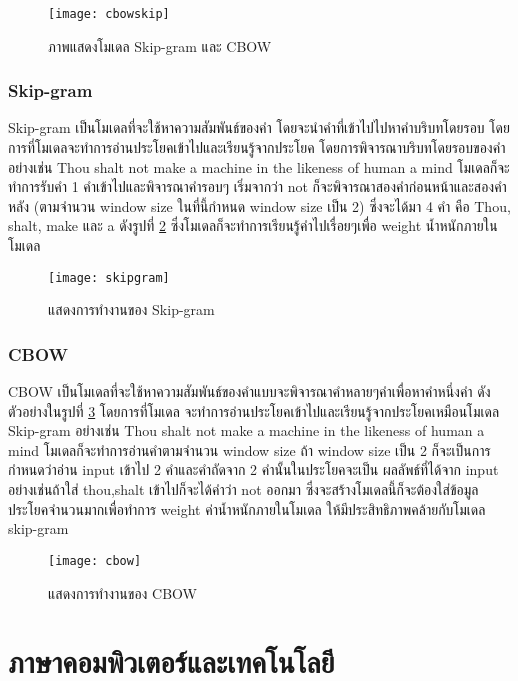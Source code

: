 \begin{figure}[H]
    \centering
    \texttt{[image: cbowskip]}
    \caption{ภาพแสดงโมเดล Skip-gram และ CBOW \cite{ichi}}\label{fig:cbowskip}
\end{figure}

\subsubsection{Skip-gram}

Skip-gram\cite{ichi} เป็นโมเดลที่จะใช้หาความสัมพันธ์ของคำ โดยจะนำคำที่เข้าไปไปหาคำบริบทโดยรอบ โดยการที่โมเดลจะทำการอ่านประโยคเข้าไปและเรียนรู้จากประโยค 
โดยการพิจารณาบริบทโดยรอบของคำ อย่างเช่น Thou shalt not make a machine in the likeness of human a mind โมเดลก็จะทำการรับคำ 
1 คำเข้าไปและพิจารณาคำรอบๆ เริ่มจากว่า not ก็จะพิจารณาสองคำก่อนหน้าและสองคำหลัง (ตามจำนวน window size ในที่นี้กำหนด window size เป็น 2) 
ซึ่งจะได้มา 4 คำ คือ Thou, shalt, make และ a ดังรูปที่ \ref{fig:skipgram} ซึ่งโมเดลก็จะทำการเรียนรู้คำไปเรื่อยๆเพื่อ weight น้ำหนักภายในโมเดล
\begin{figure}[H]
    \centering
    \texttt{[image: skipgram]}
    \caption{แสดงการทำงานของ Skip-gram \cite{ichi}}\label{fig:skipgram}
\end{figure}

\subsubsection{CBOW}
CBOW\cite{ichi} เป็นโมเดลที่จะใช้หาความสัมพันธ์ของคำแบบจะพิจารณาคำหลายๆคำเพื่อหาคำหนึ่งคำ ดังตัวอย่างในรูปที่ \ref{fig:cbow} โดยการที่โมเดล
จะทำการอ่านประโยคเข้าไปและเรียนรู้จากประโยคเหมือนโมเดล Skip-gram อย่างเช่น Thou shalt not make a machine in the likeness of human a mind 
โมเดลก็จะทำการอ่านคำตามจำนวน window size ถ้า window size เป็น 2 ก็จะเป็นการกำหนดว่าอ่าน input เข้าไป 2 คำและคำถัดจาก 2 คำนั้นในประโยคจะเป็น
ผลลัพธ์ที่ได้จาก input  อย่างเช่นถ้าใส่ thou,shalt เข้าไปก็จะได้คำว่า not ออกมา ซึ่งจะสร้างโมเดลนี้ก็จะต้องใส่ข้อมูลประโยคจำนวนมากเพื่อทำการ weight 
ค่าน้ำหนักภายในโมเดล ให้มีประสิทธิภาพคล้ายกับโมเดล skip-gram

\begin{figure}[H]
    \centering
    \texttt{[image: cbow]}
    \caption{แสดงการทำงานของ CBOW \cite{ichi}}\label{fig:cbow}
\end{figure}

\section{ภาษาคอมพิวเตอร์และเทคโนโลยี }

